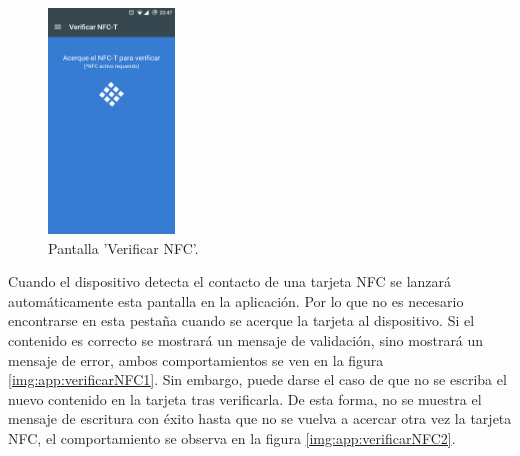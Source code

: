 \documentclass[../PFC.tex]{subfiles}
\begin{document}
\begin{figure}[H]
  \centering
  \includegraphics[width=0.3\textwidth]{./img/app/verificarNFC}
  \caption{Pantalla 'Verificar NFC'.}
  \label{img:app:verificarNFC}
\end{figure}  

Cuando el dispositivo detecta el contacto de una tarjeta NFC se lanzará automáticamente esta pantalla en la aplicación. Por lo que no es necesario encontrarse en esta pestaña cuando se acerque la tarjeta al dispositivo. Si el contenido es correcto se mostrará un mensaje de validación, sino mostrará un mensaje de error, ambos comportamientos se ven en la figura \ref{img:app:verificarNFC1}. Sin embargo, puede darse el caso de que no se escriba el nuevo contenido en la tarjeta tras verificarla. De esta forma, no se muestra el mensaje de escritura con éxito hasta que no se vuelva a acercar otra vez la tarjeta NFC, el comportamiento se observa en la figura \ref{img:app:verificarNFC2}.
\end{document}
